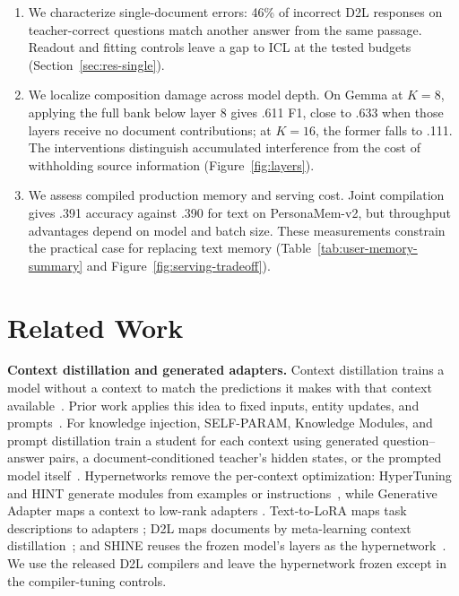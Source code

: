 \documentclass{article}
\begin{document}
\begin{enumerate}[leftmargin=*,nosep]
\item We characterize single-document errors: 46\% of incorrect D2L responses
on teacher-correct questions match another answer from the same passage.
Readout and fitting controls leave a gap to ICL at the tested budgets
(Section~\ref{sec:res-single}).
\item We localize composition damage across model depth. On Gemma at $K=8$, applying
the full bank below layer 8 gives .611 F1, close to .633 when those layers
receive no document contributions; at $K=16$, the former falls to .111.
The interventions distinguish accumulated interference from the cost of
withholding source information (Figure~\ref{fig:layers}).
\item We assess compiled production memory and serving cost. Joint compilation
gives .391 accuracy against .390 for text on PersonaMem-v2, but throughput
advantages depend on model and batch size. These measurements constrain the
practical case for replacing text memory (Table~\ref{tab:user-memory-summary}
and Figure~\ref{fig:serving-tradeoff}).
\end{enumerate}

\section{Related Work}
\label{sec:related}

\textbf{Context distillation and generated adapters.} Context distillation trains a
model without a context to match the predictions it makes with that context
available~\citep{askell2021general,snell2022learning}. Prior work applies this idea
to fixed inputs, entity updates, and prompts~\citep{choi2023fixed,padmanabhan2023propagating,bhargava2024prompt}.
For knowledge injection, SELF-PARAM, Knowledge Modules, and prompt distillation train
a student for each context using generated question--answer pairs, a
document-conditioned teacher's hidden states, or the prompted model
itself~\citep{wang2025selfupdatable,caccia2025training,kujanpaa2025efficient}.
Hypernetworks remove the per-context optimization: HyperTuning and HINT generate
modules from examples or instructions~\citep{phang2023hypertuning,ivison2023hint},
while Generative Adapter maps a context to low-rank adapters
\citep{chen2025generative}. Text-to-LoRA maps task descriptions to adapters
\citep{charakorn2025texttolora}; D2L maps documents by meta-learning context
distillation~\citep{charakorn2026doctolora}; and SHINE reuses the frozen model's
layers as the hypernetwork~\citep{liu2026shine}. We use the released D2L compilers
and leave the hypernetwork frozen except in the compiler-tuning controls.
\end{document}
